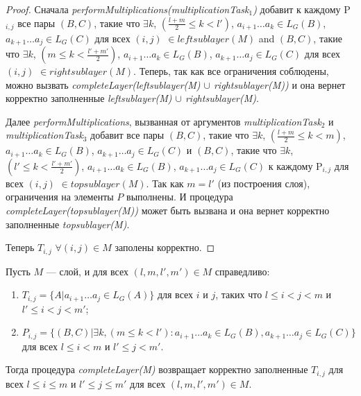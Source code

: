 \documentclass[14pt]{matmex-diploma-custom}
\begin{document}
\begin{proof}

Сначала \textit{performMultiplications(multiplicationTask$_1$)} добавит к каждому P$_{i,j}$ все пары 
$(B, C)$, такие что $\exists k$, $(\frac{l+m}{2} \le k < l')$, $a_{i + 1} \dots a_{k} \in L_{G}(B)$, $a_{k + 1} \dots a_{j} \in L_{G}(C)$ для всех $(i, j)$ $\in leftsublayer(M)$
and
$(B, C)$, такие что $\exists k$, $(m \le k < \frac{l'+m'}{2})$, $a_{i + 1} \dots a_{k} \in L_{G}(B)$, $a_{k + 1} \dots a_{j} \in L_{G}(C)$ для всех $(i, j)$ $\in rightsublayer(M)$.
Теперь, так как все ограничения соблюдены, можно вызвать \textit{completeLayer(leftsublayer(M) $\cup$ rightsublayer(M))} и она вернет корректно заполненные \textit{leftsublayer(M) $\cup$ rightsublayer(M)}.

Далее \textit{performMultiplications}, вызванная от аргументов
\textit{multiplicationTask$_2$} и \textit{multiplicationTask$_3$} добавит все пары
$(B, C)$, такие что $\exists k$, $(\frac{l+m}{2} \le k < m)$, $a_{i + 1} \dots a_{k} \in L_{G}(B)$, $a_{k + 1} \dots a_{j} \in L_{G}(C)$ 
и 
$(B, C)$, такие что $\exists k$, $(l' \le k < \frac{l'+m'}{2})$, $a_{i + 1} \dots a_{k} \in L_{G}(B)$, $a_{k + 1} \dots a_{j} \in L_{G}(C)$
к каждому P$_{i,j}$ для всех $(i, j)$ $\in topsublayer(M)$. 
Так как $m = l'$ (из построения слоя), ограничения на элементы $P$ выполнены.
И процедура \textit{completeLayer(topsublayer(M))} может быть вызвана и она вернет корректно заполненные \textit{topsublayer(M)}.

Теперь $T_{i, j}$ $\forall (i, j) \in M$ заполены корректно.

\end{proof}

\begin{theorem}
Пусть $M$ --- слой, и для всех $(l, m, l', m') \in M$ справедливо:
\begin{enumerate}
  \item $T_{i, j} = \{ A |  a_{i + 1} \dots a_{j} \in L_G(A)\}$ для всех $i$ и $j$, таких что $l \leq i < j < m$ и $l' \leq i < j < m'$;
  \item $P_{i, j} =  \{ (B, C) |\exists k, (m \le k < l'): a_{i + 1} \dots a_{k} \in L_G(B), a_{k + 1} \dots a_{j} \in L_G(C)\}$ для всех $l \leq i < m$ и $l' \leq j < m'$.
\end{enumerate}

Тогда процедура \textit{completeLayer(M)} возвращает корректно заполненные $T_{i, j}$ для всех $l \leq i \le m$ и $l' \leq j \le m'$ для всех $(l, m, l', m') \in M$.
\end{theorem}
\end{document}
